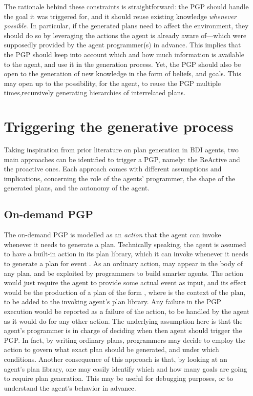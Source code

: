 \documentclass[12pt,a4paper,openright,twoside]{book}
\begin{document}
The rationale behind these constraints is straightforward: the \ac{PGP} should handle the goal it was triggered for, and it should reuse existing knowledge \emph{whenever possible}.
%
In particular, if the generated plans need to affect the environment, they should do so by leveraging the actions the agent is already aware of---which were supposedly provided by the agent programmer(s) in advance.
%
This implies that the \ac{PGP} should keep into account which and how much information is available to the agent, and use it in the generation process.
%
Yet, the \ac{PGP} should also be open to the generation of new knowledge in the form of beliefs, and goals.
%
This may open up to the possibility, for the agent, to reuse the \ac{PGP} multiple times,recursively generating hierarchies of interrelated plans.

\section{Triggering the generative process}\label{sec:pgp-when}

Taking inspiration from prior literature on plan generation in \ac{BDI} agents, two main approaches can be identified to trigger a \ac{PGP}, namely: the \ac{ReAct}ive and the proactive ones. 
%
Each approach comes with different assumptions and implications, concerning the role of the agents' programmer, the shape of the generated plans, and the autonomy of the agent.

\subsection{On-demand PGP}

The on-demand \ac{PGP} is modelled as an \emph{action} that the agent can invoke whenever it needs to generate a plan.
%
Technically speaking, the agent is assumed to have a built-in action  in its plan library, which it can invoke whenever it needs to generate a plan for event .
%
As an ordinary \agentspeak{} action,  may appear in the body of any plan, and be exploited by programmers to build smarter agents.
%
The action would just require the agent to provide some actual event  as input, and its effect would be the production of a plan of the form , where  is the context of the plan, to be added to the invoking agent's plan library.
%
Any failure in the \ac{PGP} execution would be reported as a failure of the action, to be handled by the agent as it would do for any other action.
%
The underlying assumption here is that the agent's programmer is in charge of deciding when then agent should trigger the \ac{PGP}.
%
In fact, by writing ordinary \agentspeak{} plans, programmers may decide to employ the  action to govern what exact plan should be generated, and under which conditions.
%
Another consequence of this approach is that, by looking at an agent's plan library, one may easily identify which and how many goals are going to require plan generation.
%
This may be useful for debugging purposes, or to understand the agent's behavior in advance.
\end{document}

